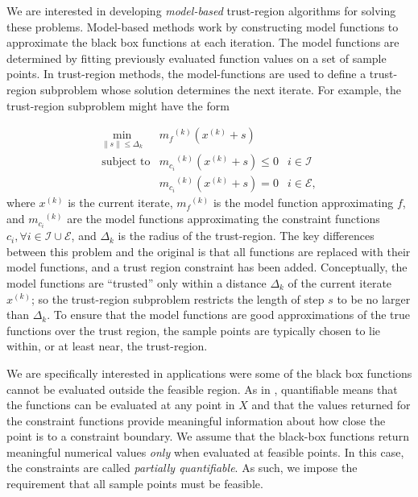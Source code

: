 \documentclass{article}
\theoremstyle{case}
\newcommand{\norm}[1]{\| #1 \|}
\newcommand{\union}{\cup}
\newcommand{\modelk}{{{m}_f}^{(k)}}
\newcommand{\modelconstrainti}{{{m}_{c_i}}^{(k)}}
\newcommand{\iteratek}{{x}^{(k)}}
\begin{document}
We are interested in developing {\em model-based} trust-region algorithms for solving these problems.
Model-based methods work by constructing model functions to approximate the black box functions at each iteration.
The model functions are determined by fitting previously evaluated function values on a set of sample points.
In trust-region methods, the model-functions are used to define a trust-region subproblem whose solution determines the next iterate.
For example, the trust-region subproblem might have the form

\[ \begin{array}{ccl} \min_{\norm{s} \le \Delta_k}
 & \modelk (\iteratek+s) \\
\mbox{subject to} & \modelconstrainti(\iteratek + s) \le 0 & i \in \mathcal{I} \\
& \modelconstrainti(\iteratek + s) = 0 & i \in \mathcal{E},
\end{array}
\]
where $\iteratek$ is the current iterate, $\modelk$ is the model function approximating $f$,  and $\modelconstrainti$ are the model functions approximating the constraint functions $c_i, \forall i \in \mathcal{I} \union \mathcal{E}$, and $\Delta_k$ is the radius of the trust-region.
The key differences between this problem and the original is that all functions are replaced with their model functions, and a trust region constraint has been added.
Conceptually, the model functions are ``trusted'' only within a distance $\Delta_k$ of the current iterate $\iteratek$; so the trust-region subproblem restricts the length of step $s$ to be no larger than $\Delta_k$.
To ensure that the model functions are good approximations of the true functions over the trust region, the sample points are typically chosen to lie within, or at least near, the trust-region.


We are specifically interested in applications were some of the black box functions cannot be evaluated outside the feasible region.
As in \cite{DUMMY:typesofconstraints}, quantifiable means that the functions can be evaluated at any point in $X$ and that the values returned for the constraint functions provide meaningful information about how close the point is to a constraint boundary.
We assume that the black-box functions return meaningful numerical values \emph{only} when evaluated at feasible points.
In this case, the constraints are called {\em partially quantifiable}.   
As such, we impose the requirement that all sample points must be feasible.
\end{document}
